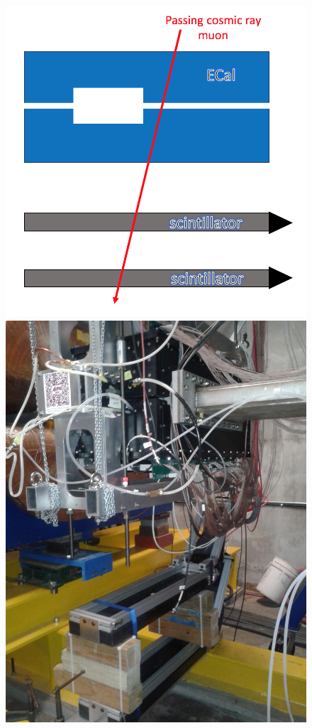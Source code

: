 \documentclass[twoside]{article}
\begin{document}
\begin{figure}[hbt]
\begin{minipage}{0.45\textwidth}
\includegraphics[width=\textwidth]{pics/cosmicSketch.png}
\end{minipage}\hfill\begin{minipage}{0.45\textwidth}
 \includegraphics[width=\textwidth]{pics/cosmicPic.jpg}

\end{minipage}
\end{figure}
\end{document}
